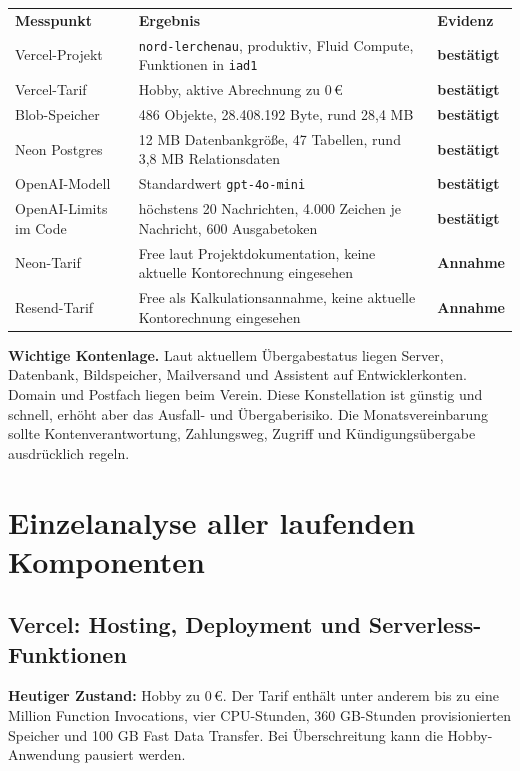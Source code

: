 \documentclass[11pt,a4paper]{article}
\newcommand{\statusok}{\textcolor{NordGreen}{\sffamily\bfseries bestätigt}}
\newcommand{\statusassumed}{\textcolor{NordAmber}{\sffamily\bfseries Annahme}}
\newcommand{\eur}[1]{#1\,€}
\begin{document}
\begin{tabularx}{\textwidth}{L{35mm}Y L{32mm}}
  \toprule
  \color{white}\sffamily\bfseries Messpunkt &
  \color{white}\sffamily\bfseries Ergebnis &
  \color{white}\sffamily\bfseries Evidenz \\
  Vercel-Projekt & \texttt{nord-lerchenau}, produktiv, Fluid Compute, Funktionen in \texttt{iad1} & \statusok \\
  Vercel-Tarif & Hobby, aktive Abrechnung zu \eur{0} & \statusok \\
  Blob-Speicher & 486 Objekte, 28.408.192 Byte, rund 28,4 MB & \statusok \\
  Neon Postgres & 12 MB Datenbankgröße, 47 Tabellen, rund 3,8 MB Relationsdaten & \statusok \\
  OpenAI-Modell & Standardwert \texttt{gpt-4o-mini} & \statusok \\
  OpenAI-Limits im Code & höchstens 20 Nachrichten, 4.000 Zeichen je Nachricht, 600 Ausgabetoken & \statusok \\
  Neon-Tarif & Free laut Projektdokumentation, keine aktuelle Kontorechnung eingesehen & \statusassumed \\
  Resend-Tarif & Free als Kalkulationsannahme, keine aktuelle Kontorechnung eingesehen & \statusassumed \\
  \bottomrule
\end{tabularx}

\begin{riskbox}
  \textbf{Wichtige Kontenlage.} Laut aktuellem Übergabestatus liegen Server, Datenbank, Bildspeicher, Mailversand und Assistent auf Entwicklerkonten. Domain und Postfach liegen beim Verein. Diese Konstellation ist günstig und schnell, erhöht aber das Ausfall- und Übergaberisiko. Die Monatsvereinbarung sollte Kontenverantwortung, Zahlungsweg, Zugriff und Kündigungsübergabe ausdrücklich regeln.
\end{riskbox}

\section{Einzelanalyse aller laufenden Komponenten}

\subsection{Vercel: Hosting, Deployment und Serverless-Funktionen}

\textbf{Heutiger Zustand:} Hobby zu \eur{0}. Der Tarif enthält unter anderem bis zu eine Million Function Invocations, vier CPU-Stunden, 360 GB-Stunden provisionierten Speicher und 100 GB Fast Data Transfer. Bei Überschreitung kann die Hobby-Anwendung pausiert werden.
\end{document}
